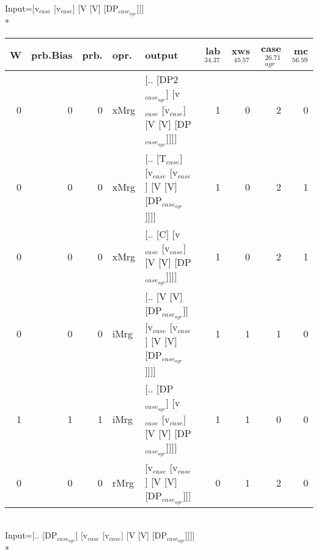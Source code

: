 \begingroup\scriptsize Input=[v$_{case}$ [v$_{case}$] [V [V] [DP$_{case_{agr}}$]]]\\*
\begin{tabularx}{\linewidth}{rrrlXrrrr}
\hline
   W &   prb.Bias &   prb. & opr.   & output                                                             &   lab$^{34.37}$ &   xws$^{45.57}$ &   case$_{agr}^{26.71}$ &   mc$^{56.59}$ \\
\hline
   0 &       0 &   0 & xMrg & [.. [DP2$_{case_{agr}}$] [v$_{case}$ [v$_{case}$] [V [V] [DP$_{case_{agr}}$]]]]        &             1 &             0 &                  2 &            0 \\
   0 &       0 &   0 & xMrg & [.. [T$_{case}$] [v$_{case}$ [v$_{case}$] [V [V] [DP$_{case_{agr}}$]]]]              &             1 &             0 &                  2 &            1 \\
   0 &       0 &   0 & xMrg & [.. [C] [v$_{case}$ [v$_{case}$] [V [V] [DP$_{case_{agr}}$]]]]                   &             1 &             0 &                  2 &            1 \\
   0 &       0 &   0 & iMrg & [.. [V [V] [DP$_{case_{agr}}$]] [v$_{case}$ [v$_{case}$] [V [V] [DP$_{case_{agr}}$]]]] &             1 &             1 &                  1 &            0 \\
   1 &       1 &   1 & iMrg & [.. [DP$_{case_{agr}}$] [v$_{case}$ [v$_{case}$] [V [V] [DP$_{case_{agr}}$]]]]         &             1 &             1 &                  0 &            0 \\
   0 &       0 &   0 & rMrg & [v$_{case}$ [v$_{case}$] [V [V] [DP$_{case_{agr}}$]]]                            &             0 &             1 &                  2 &            0 \\
\hline
\end{tabularx}\endgroup\\
\begingroup\scriptsize Input=[.. [DP$_{case_{agr}}$] [v$_{case}$ [v$_{case}$] [V [V] [DP$_{case_{agr}}$]]]]\\*
